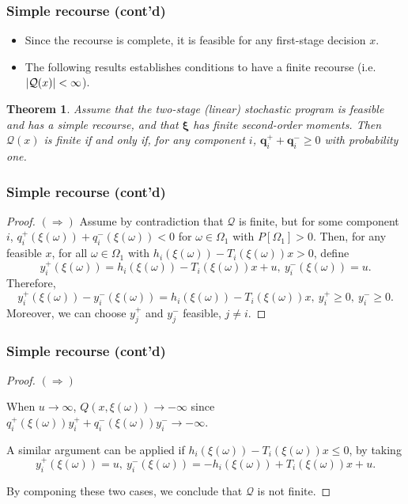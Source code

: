 \documentclass{beamer}
\newtheorem{theo}{Theorem}
\def\bxi{\boldsymbol\xi}
\def\bxi{\boldsymbol\xi}
\begin{document}
\begin{frame}
\frametitle{Simple recourse (cont'd)}

\begin{itemize}
	\item 
Since the recourse is complete, it is feasible for any first-stage decision $x$.
\item
The following results establishes conditions to have a finite recourse (i.e. $| {\mathcal{Q}}(x) | < \infty$).
\end{itemize}

\begin{theo}
Assume that the two-stage (linear) stochastic program is feasible and has a simple recourse, and that $\bxi$ has finite second-order moments.
Then $\mathcal{Q}(x)$ is finite if and only if, for any component $i$, $\boldsymbol{q}_i^+ + \boldsymbol{q}_i^- \geq 0$ with probability one.
\end{theo}

\end{frame}

\begin{frame}
\frametitle{Simple recourse (cont'd)}

\begin{proof}
{\bf $(\Rightarrow)$} 
Assume by contradiction that $\mathcal{Q}$ is finite, but for some component $i$, $q_i^+(\xi(\omega)) + q_i^-(\xi(\omega)) < 0$ for $\omega \in \Omega_1$ with $P[\Omega_1] > 0$.
Then, for any feasible $x$, for all $\omega \in \Omega_1$ with $h_i(\xi(\omega))-T_i(\xi(\omega))x > 0$, define
$$
y_i^+(\xi(\omega)) = h_i(\xi(\omega)) - T_i(\xi(\omega))x + u,\  y_i^-(\xi(\omega)) = u.
$$
Therefore, 
$$
y_i^+(\xi(\omega)) - y_i^-(\xi(\omega)) = h_i(\xi(\omega)) - T_i(\xi(\omega))x,\ y_i^+ \geq 0,\ y_i^- \geq 0.
$$
Moreover, %
we can choose $y_j^+$ and $y_j^-$ feasible, $j \ne i$.

\end{proof}

\end{frame}

\begin{frame}
\frametitle{Simple recourse (cont'd)}

\begin{proof}
{\bf $(\Rightarrow)$} 

When $u \rightarrow \infty$, $Q(x, \xi(\omega)) \rightarrow -\infty$ since $q_i^+(\xi(\omega))y_i^+ + q_i^-(\xi(\omega))y_i^- \rightarrow -\infty$.

\mbox{}

A similar argument can be applied if $h_i(\xi(\omega))-T_i(\xi(\omega))x \leq 0$, by taking
$$
y_i^+(\xi(\omega)) = u,\ y_i^-(\xi(\omega)) = -h_i(\xi(\omega)) + T_i(\xi(\omega))x + u.
$$

\mbox{}

By componing these two cases, we conclude that  $\mathcal{Q}$ is not finite.
\end{proof}

\end{frame}
\end{document}
